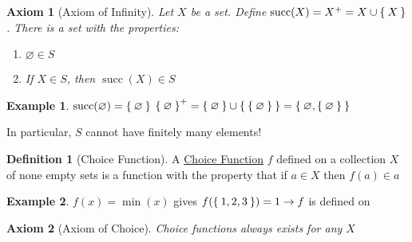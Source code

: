 \documentclass[12pt]{amsart}
\theoremstyle{plain}
\newtheorem{AXM}{Axiom}
\theoremstyle{remark}
\theoremstyle{definition}
\newtheorem*{define}{Definition}
\newtheorem*{eg}{Example}
\begin{document}
\begin{AXM}[Axiom of Infinity]
	Let $X$ be a set. Define $\operatorname{succ}(X) = X^+ =  X \cup \Set{X}$. 
	\newline
	There is a set with the properties:
	\begin{enumerate}[(1)]
		\item $\varnothing \in S$
		\item If $X \in S$, then $\operatorname{succ}(X) \in S$
	\end{enumerate}
\end{AXM}
\begin{eg}
	\hfill
	\newline
	$\operatorname{succ}(\varnothing) = \Set{\varnothing}$
	\newline
	$\Set{\varnothing}^+ = \Set{\varnothing} \cup \Set{\Set{\varnothing}} = \Set{\varnothing, \Set{\varnothing}}$
\end{eg}
	In particular, $S$ cannot have finitely many elements!
\begin{define}[Choice Function]
	A \ul{Choice Function} $f$ defined on a collection $X$ of none empty sets is a function with the property that if $a \in X$ then $f(a) \in a$
\end{define}

\begin{eg}
	$f(x) = \min(x)$ gives $f(\Set{1,2,3}) = 1 \rightarrow f$ is defined on  
\end{eg}

\begin{AXM}[Axiom of Choice]
	Choice functions always exists for any $X$
\end{AXM}
\end{document}

